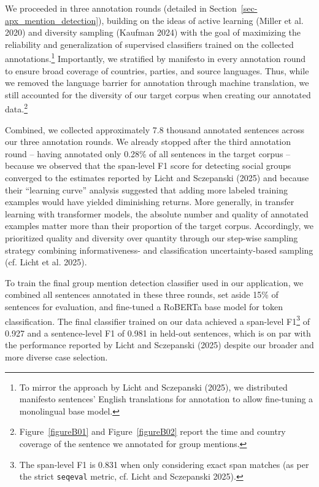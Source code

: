 \documentclass[12pt]{article}
\begin{document}
We proceeded in three annotation rounds (detailed in Section~\ref{sec-apx_mention_detection}), building on the ideas of active learning (Miller et al. 2020) and diversity sampling (Kaufman 2024) with the goal of maximizing the reliability and generalization of supervised classifiers trained on the collected annotations.\footnote{To mirror the approach by Licht and Sczepanski (2025), we distributed manifesto sentences' English translations for annotation to allow fine-tuning a monolingual base model.} Importantly, we stratified by manifesto in every annotation round to ensure broad coverage of countries, parties, and source languages.
Thus, while we removed the language barrier for annotation through machine translation, we still accounted for the diversity of our target corpus when creating our annotated data.\footnote{
  Figure~\ref{figureB01} and Figure~\ref{figureB02} report the time and country coverage of the sentence we annotated for group mentions.
}

Combined, we collected approximately 7.8 thousand annotated sentences across our three annotation rounds.
We already stopped after the third annotation round -- having annotated only 0.28\% of all sentences in the target corpus -- because we observed that the span-level F1 score for detecting social groups converged to the estimates reported by Licht and Sczepanski (2025) and because their ``learning curve'' analysis suggested that adding more labeled training examples would have yielded diminishing returns.
More generally, in transfer learning with transformer models, the absolute number and quality of annotated examples matter more than their proportion of the target corpus.
Accordingly, we prioritized quality and diversity over quantity through our step-wise sampling strategy combining informativeness- and classification uncertainty-based sampling (cf. Licht et al. 2025).

To train the final group mention detection classifier used in our application, we combined all sentences annotated in these three rounds, set aside 15\% of sentences for evaluation, and fine-tuned a RoBERTa base model for token classification.
The final classifier trained on our data achieved a span-level F1\footnote{The span-level F1 is 0.831 when only considering exact span matches (as per the strict \texttt{seqeval} metric, cf. Licht and Sczepanski 2025).} of 0.927 and a sentence-level F1 of 0.981 in held-out sentences, which is on par with the performance reported by Licht and Sczepanski (2025) despite our broader and more diverse case selection.
\end{document}
